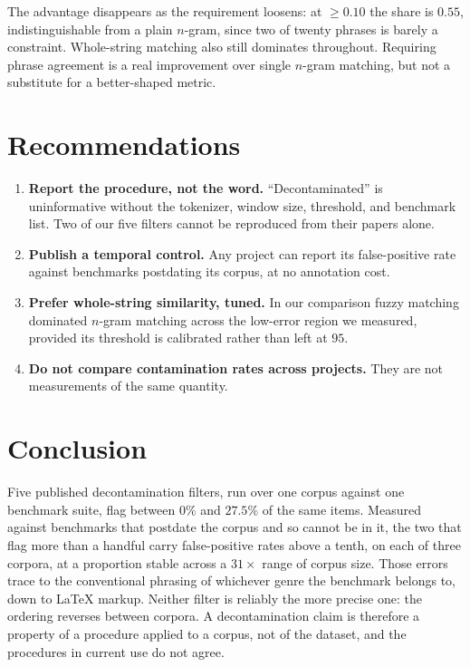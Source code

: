 \documentclass[11pt]{article}
\begin{document}
The advantage disappears as the requirement loosens: at $\geq 0.10$ the share is
$0.55$, indistinguishable from a plain $n$-gram, since two of twenty phrases is
barely a constraint. Whole-string matching also still dominates throughout.
Requiring phrase agreement is a real improvement over single $n$-gram matching,
but not a substitute for a better-shaped metric.

\section{Recommendations}

\begin{enumerate}
\item \textbf{Report the procedure, not the word.} ``Decontaminated'' is
uninformative without the tokenizer, window size, threshold, and benchmark list.
Two of our five filters cannot be reproduced from their papers alone.
\item \textbf{Publish a temporal control.} Any project can report its
false-positive rate against benchmarks postdating its corpus, at no annotation
cost.
\item \textbf{Prefer whole-string similarity, tuned.} In our comparison fuzzy
matching dominated $n$-gram matching across the low-error region we measured, provided its
threshold is calibrated rather than left at $95$.
\item \textbf{Do not compare contamination rates across projects.} They are not
measurements of the same quantity.
\end{enumerate}

\section{Conclusion}

Five published decontamination filters, run over one corpus against one benchmark
suite, flag between $0\%$ and $27.5\%$ of the same items. Measured against
benchmarks that postdate the corpus and so cannot be in it, the two that flag more
than a handful carry false-positive rates above a tenth, on each of three corpora,
at a proportion stable across a $31\times$ range of corpus size. Those errors trace
to the conventional phrasing of whichever genre the benchmark belongs to, down to
\LaTeX{} markup. Neither filter is reliably the more precise one: the ordering
reverses between corpora. A decontamination claim is therefore a property of a
procedure applied to a corpus, not of the dataset, and the procedures in current
use do not agree.
\end{document}
